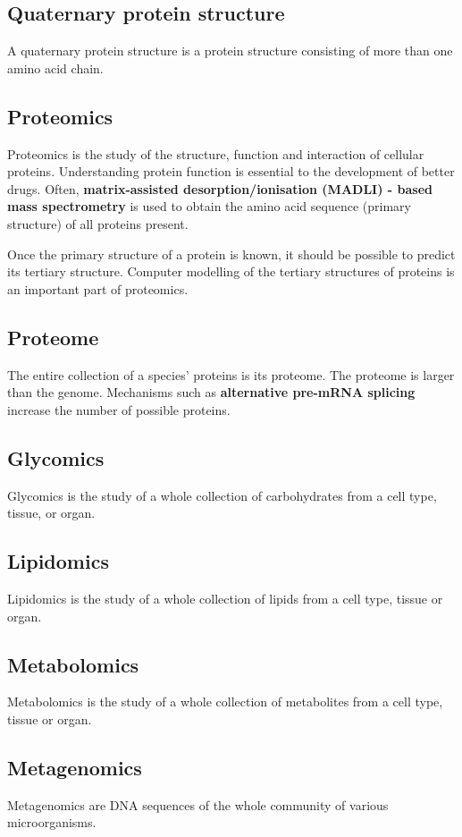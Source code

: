 \documentclass[11pt]{article}
\begin{document}
\subsection{Quaternary protein structure}
\label{sec:orgb2e10c7}
A quaternary protein structure is a protein structure consisting of more than one amino acid chain.
\subsection{Proteomics}
\label{sec:org2f8b516}
Proteomics is the study of the structure, function and interaction of cellular proteins. Understanding protein function is essential to the development of better drugs. Often, \textbf{matrix-assisted desorption/ionisation (MADLI) - based mass spectrometry} is used to obtain the amino acid sequence (primary structure) of all proteins present.


Once the primary structure of a protein is known, it should be possible to predict its tertiary structure. Computer modelling of the tertiary structures of proteins is an important part of proteomics.
\subsection{Proteome}
\label{sec:org342ae4c}
The entire collection of a species' proteins is its proteome. The proteome is larger than the genome. Mechanisms such as \textbf{alternative pre-mRNA splicing} increase the number of possible proteins.
\subsection{Glycomics}
\label{sec:org3c8dba5}
Glycomics is the study of a whole collection of carbohydrates from a cell type, tissue, or organ.
\subsection{Lipidomics}
\label{sec:orgb4b4279}
Lipidomics is the study of a whole collection of lipids from a cell type, tissue or organ.
\subsection{Metabolomics}
\label{sec:org5f16af7}
Metabolomics is the study of a whole collection of metabolites from a cell type, tissue or organ.
\subsection{Metagenomics}
\label{sec:org52141d6}
Metagenomics are DNA sequences of the whole community of various microorganisms.
\end{document}

